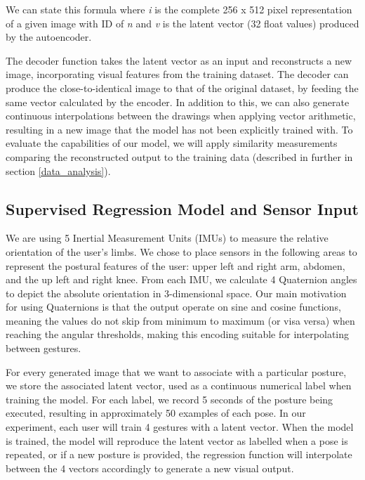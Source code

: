 We can state this formula where \textit{i} is the complete 256 x 512 pixel representation of a given image with ID of \textit{n} and \textit{v} is the latent vector (32 float values) produced by the autoencoder.

The decoder function takes the latent vector as an input and reconstructs a new image, incorporating visual features from the training dataset. The decoder can produce the close-to-identical image to that of the original dataset, by feeding the same vector calculated by the encoder. In addition to this, we can also generate continuous interpolations between the drawings when applying vector arithmetic, resulting in a new image that the model has not been explicitly trained with. To evaluate the capabilities of our model, we will apply similarity measurements comparing the reconstructed output to the training data (described in further in section \ref{data_analysis}).

\subsection{Supervised Regression Model and Sensor Input}\label{sensor_input}

We are using {5} Inertial Measurement Units (IMUs) to measure the relative orientation of the user’s limbs. We chose to place sensors in the following areas to represent the postural features of the user: {upper left and right arm, abdomen, and the up left and right knee}. From each IMU, we calculate 4 Quaternion angles to depict the  absolute orientation in 3-dimensional space. Our main motivation for using Quaternions is that the output operate on sine and cosine functions, meaning the values do not skip from minimum to maximum (or visa versa) when reaching the angular thresholds, making this encoding suitable for interpolating between gestures.

For every generated image that we want to associate with a particular posture, we store the associated latent vector, used as a continuous numerical label when training the model. For each label, we record 5 seconds of the posture being executed, resulting in approximately 50 examples of each pose. In our experiment, each user will train 4 gestures with a latent vector. When the model is trained, the model will reproduce the latent vector as labelled when a pose is repeated, or if a new posture is provided, the regression function will interpolate between the 4 vectors accordingly to generate a new visual output.


